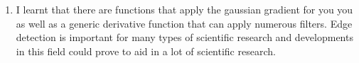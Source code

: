\documentclass{article}
\begin{document}
\begin{enumerate}
\begin{figure}[H]
	\begin{subfigure}{.5\textwidth}
		\centering
		\texttt{[image: Sobel.pdf]}
		\caption{Sobel Filter}
	\end{subfigure}
	\begin{subfigure}{.5\textwidth}
		\centering
		\texttt{[image: Prewitt.pdf]}
		\caption{Prewitt Filter}
	\end{subfigure}
	\end{figure}
	\item I learnt that there are functions that apply the gaussian gradient for you you as well as a generic derivative function that can apply numerous filters. Edge detection is important for many types of scientific research and developments in this field could prove to aid in a lot of scientific research. 
\end{enumerate}
\end{document}
